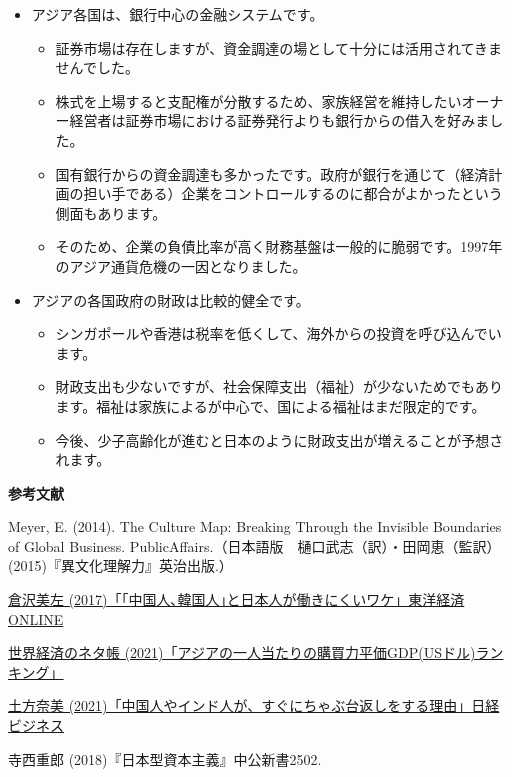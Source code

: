 \documentclass[
]{book}
\begin{document}
\begin{itemize}
\item
  アジア各国は、銀行中心の金融システムです。

  \begin{itemize}
  \item
    証券市場は存在しますが、資金調達の場として十分には活用されてきませんでした。
  \item
    株式を上場すると支配権が分散するため、家族経営を維持したいオーナー経営者は証券市場における証券発行よりも銀行からの借入を好みました。
  \item
    国有銀行からの資金調達も多かったです。政府が銀行を通じて（経済計画の担い手である）企業をコントロールするのに都合がよかったという側面もあります。
  \item
    そのため、企業の負債比率が高く財務基盤は一般的に脆弱です。1997年のアジア通貨危機の一因となりました。
  \end{itemize}
\item
  アジアの各国政府の財政は比較的健全です。

  \begin{itemize}
  \item
    シンガポールや香港は税率を低くして、海外からの投資を呼び込んでいます。
  \item
    財政支出も少ないですが、社会保障支出（福祉）が少ないためでもあります。福祉は家族によるが中心で、国による福祉はまだ限定的です。
  \item
    今後、少子高齢化が進むと日本のように財政支出が増えることが予想されます。
  \end{itemize}
\end{itemize}

{\textbf{参考文献}}

Meyer, E. (2014). The Culture Map: Breaking Through the Invisible Boundaries of Global Business. PublicAffairs.（日本語版　樋口武志（訳）・田岡恵（監訳）(2015)『異文化理解力』英治出版.）

\href{https://toyokeizai.net/articles/-/160021}{倉沢美左 (2017)「｢中国人､韓国人｣と日本人が働きにくいワケ」東洋経済ONLINE}

\href{https://ecodb.net/ranking/area/A/imf_ppppc.html}{世界経済のネタ帳 (2021)「アジアの一人当たりの購買力平価GDP(USドル)ランキング」}

\href{https://business.nikkei.com/atcl/seminar/20/00046/081700004/?n_cid=nbpnb_twed}{土方奈美 (2021)「中国人やインド人が、すぐにちゃぶ台返しをする理由」日経ビジネス}

寺西重郎 (2018)『日本型資本主義』中公新書2502.
\end{document}
